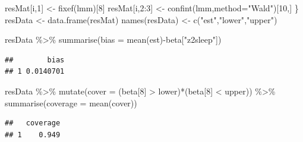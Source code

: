 \documentclass[
]{article}
\newenvironment{Shaded}{\begin{snugshade}}{\end{snugshade}}
\newcommand{\AttributeTok}[1]{\textcolor[rgb]{0.77,0.63,0.00}{#1}}
\newcommand{\DecValTok}[1]{\textcolor[rgb]{0.00,0.00,0.81}{#1}}
\newcommand{\FunctionTok}[1]{\textcolor[rgb]{0.00,0.00,0.00}{#1}}
\newcommand{\NormalTok}[1]{#1}
\newcommand{\OtherTok}[1]{\textcolor[rgb]{0.56,0.35,0.01}{#1}}
\newcommand{\SpecialCharTok}[1]{\textcolor[rgb]{0.00,0.00,0.00}{#1}}
\newcommand{\StringTok}[1]{\textcolor[rgb]{0.31,0.60,0.02}{#1}}
\begin{document}
\begin{Shaded}
\begin{Highlighting}[]
\NormalTok{resMat[i,}\DecValTok{1}\NormalTok{] }\OtherTok{\textless{}{-}} \FunctionTok{fixef}\NormalTok{(lmm)[}\DecValTok{8}\NormalTok{]}
\NormalTok{resMat[i,}\DecValTok{2}\SpecialCharTok{:}\DecValTok{3}\NormalTok{] }\OtherTok{\textless{}{-}} \FunctionTok{confint}\NormalTok{(lmm,}\AttributeTok{method=}\StringTok{"Wald"}\NormalTok{)[}\DecValTok{10}\NormalTok{,]}
\NormalTok{\}}
\NormalTok{resData }\OtherTok{\textless{}{-}} \FunctionTok{data.frame}\NormalTok{(resMat)}
\FunctionTok{names}\NormalTok{(resData) }\OtherTok{\textless{}{-}} \FunctionTok{c}\NormalTok{(}\StringTok{"est"}\NormalTok{,}\StringTok{"lower"}\NormalTok{,}\StringTok{"upper"}\NormalTok{)}
\end{Highlighting}
\end{Shaded}

\begin{Shaded}
\begin{Highlighting}[]
\NormalTok{resData }\SpecialCharTok{\%\textgreater{}\%} \FunctionTok{summarise}\NormalTok{(}\AttributeTok{bias =} \FunctionTok{mean}\NormalTok{(est)}\SpecialCharTok{{-}}\NormalTok{beta[}\StringTok{"z2sleep"}\NormalTok{])}
\end{Highlighting}
\end{Shaded}

\begin{verbatim}
##        bias
## 1 0.0140701
\end{verbatim}

\begin{Shaded}
\begin{Highlighting}[]
\NormalTok{resData }\SpecialCharTok{\%\textgreater{}\%} \FunctionTok{mutate}\NormalTok{(}\AttributeTok{cover =}\NormalTok{ (beta[}\DecValTok{8}\NormalTok{] }\SpecialCharTok{\textgreater{}}\NormalTok{ lower)}\SpecialCharTok{*}\NormalTok{(beta[}\DecValTok{8}\NormalTok{] }\SpecialCharTok{\textless{}}\NormalTok{ upper)) }\SpecialCharTok{\%\textgreater{}\%} \FunctionTok{summarise}\NormalTok{(}\AttributeTok{coverage =} \FunctionTok{mean}\NormalTok{(cover))}
\end{Highlighting}
\end{Shaded}

\begin{verbatim}
##   coverage
## 1    0.949
\end{verbatim}
\end{document}
